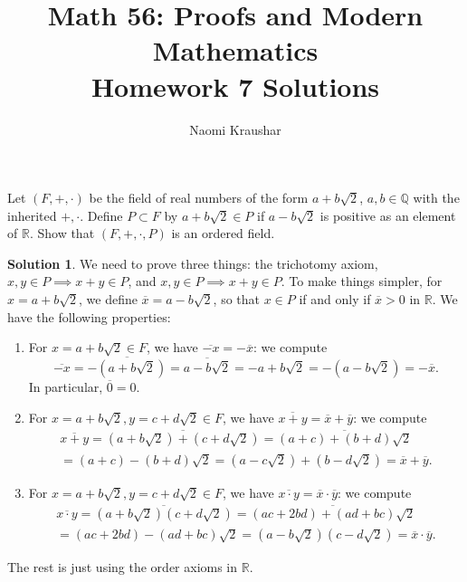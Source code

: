 \documentclass[12pt]{article}
\theoremstyle{definition}
\theoremstyle{definition}
\newtheorem*{soln}{Solution}
\newcommand{\Q}{\mathbb{Q}}
\newcommand{\R}{\mathbb{R}}
\begin{document}
\title{Math 56: Proofs and Modern Mathematics\\ Homework 7 Solutions}
\author{Naomi Kraushar}
\maketitle


\begin{prob}
Let $(F,+,\cdot)$ be the field of real numbers of the form $a+b\sqrt{2}$, $a,b\in\Q$ with the inherited $+,\cdot$. Define $P\subset F$ by $a+b\sqrt{2}\in P$ if $a-b\sqrt{2}$ is positive as an element of $\R$. Show that $(F,+,\cdot,P)$ is an ordered field.
\end{prob}


\begin{soln}
We need to prove three things: the trichotomy axiom, $x,y\in P\implies x+y\in P$, and $x,y\in P\implies x+y\in P$. To make things simpler, for $x=a+b\sqrt{2}$, we define $\overline{x}=a-b\sqrt{2}$, so that $x\in P$ if and only if $\overline{x}>0$ in $\R$. We have the following properties:
\begin{enumerate}[label=(\roman*)]
\item For $x=a+b\sqrt{2}\in F$, we have $\overline{-x}=-\overline{x}$: we compute
\[\overline{-x}=\overline{-(a+b\sqrt{2})}=\overline{a-b\sqrt{2}}=-a+b\sqrt{2}=-(a-b\sqrt{2})=-\overline{x}.\]
In particular, $\overline{0}=0$.

\item For $x=a+b\sqrt{2},y=c+d\sqrt{2}\in F$, we have $\overline{x+y}=\overline{x}+\overline{y}$: we compute
\begin{multline}
\overline{x+y}=\overline{(a+b\sqrt{2})+(c+d\sqrt{2})}=\overline{(a+c)+(b+d)\sqrt{2}}\\
=(a+c)-(b+d)\sqrt{2}=(a-c\sqrt{2})+(b-d\sqrt{2})=\overline{x}+\overline{y}.
\end{multline}

\item For $x=a+b\sqrt{2},y=c+d\sqrt{2}\in F$, we have $\overline{x\cdot y}=\overline{x}\cdot\overline{y}$: we compute
\begin{multline}
\overline{x\cdot y}=\overline{(a+b\sqrt{2})(c+d\sqrt{2})}=\overline{(ac+2bd)+(ad+bc)\sqrt{2}}\\
=(ac+2bd)-(ad+bc)\sqrt{2}=(a-b\sqrt{2})(c-d\sqrt{2})=\overline{x}\cdot\overline{y}.
\end{multline}
\end{enumerate}

The rest is just using the order axioms in $\R$.


\end{soln}
\end{document}
